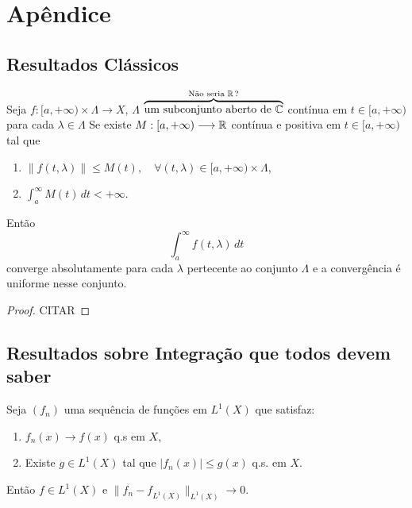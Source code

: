 \chapter{Apêndice}

\section{Resultados Clássicos}


\begin{proposition}\label{TWeierstrass}
Seja $f:[a,+\infty)\times \Lambda\longrightarrow X$, $\Lambda$ 
$\overbrace{\text{um subconjunto aberto de }\mathbb{C}}^{\text{Não seria } \mathbb{R}\,?}$ 
 contínua em $t\in [a,+\infty)$ para cada $\lambda \in \Lambda$ Se existe $M:[a,+\infty)\longrightarrow \mathbb{R}$ contínua e positiva em $t\in [a,+\infty)$ tal que
\begin{enumerate}[$(i)$]
\item $\|f(t,\lambda)\|\leq M(t),\quad \forall (t,\lambda)\in [a,+\infty)\times \Lambda$,
\item $\displaystyle \int_a^\infty M(t)\, dt<+\infty$.
\end{enumerate} 
Então 
\[\int_a^\infty f(t,\lambda)\, dt\]
converge absolutamente para cada $\lambda $ pertecente ao conjunto $\Lambda$ e a convergência é uniforme nesse conjunto.
\end{proposition}
\begin{proof}
{\color{red}CITAR}
\end{proof}


\section{Resultados sobre Integração que todos devem saber}


\begin{theorem}
Seja $(f_n)$ uma sequência de funções em $L^1(X)$ que satisfaz:
\begin{enumerate}[a]
\item $f_n(x)\to f(x)$ q.s em $X$,
\item Existe $g\in L^1(X)$ tal que $|f_n(x)|\leq g(x)$ q.s. em $X$.
\end{enumerate} 
Então $f\in L^1(X)$ e $\|{f_n-f}_{L^1(X)}\|_{L^1(X)} \to 0$.
\end{theorem}

